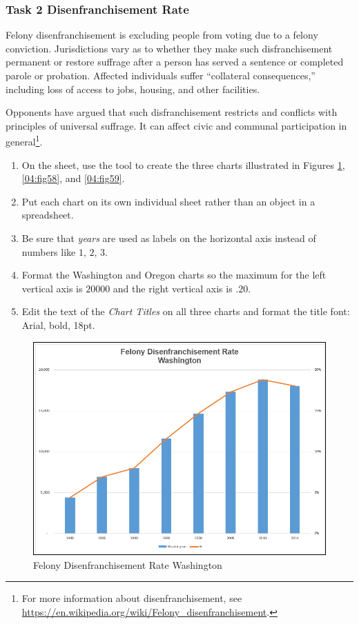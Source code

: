 \subsubsection{Task 2 Disenfranchisement Rate}

Felony disenfranchisement is excluding people from voting due to a felony conviction. Jurisdictions vary as to whether they make such disfranchisement permanent or restore suffrage after a person has served a sentence or completed parole or probation. Affected individuals suffer ``collateral consequences,'' including loss of access to jobs, housing, and other facilities.

Opponents have argued that such disfranchisement restricts and conflicts with principles of universal suffrage. It can affect civic and communal participation in general\footnote{For more information about disenfranchisement, see \url{https://en.wikipedia.org/wiki/Felony_disenfranchisement}.}.

\begin{enumbox}
	\begin{enumerate}
		\item On the  sheet, use the  tool to create the three charts illustrated in Figures \ref{04:fig57}, \ref{04:fig58}, and \ref{04:fig59}. 
		\item Put each chart on its own individual sheet rather than an object in a spreadsheet.
		\item Be sure that \textit{years} are used as labels on the horizontal axis instead of numbers like $ 1 $, $ 2 $, $ 3 $. 
		\item Format the Washington and Oregon charts so the maximum for the left vertical axis is $ 20000 $ and the right vertical axis is $ .20 $. 
		\item Edit the text of the \textit{Chart Titles} on all three charts and format the title font: Arial, bold, 18pt.
	\end{enumerate}
\end{enumbox}
	
\begin{figure}[H]
	\centering
	\includegraphics[width=\maxwidth{.95\linewidth}]{gfx/ch04_fig57}
	\caption{Felony Disenfranchisement Rate Washington}
	\label{04:fig57}
\end{figure}

